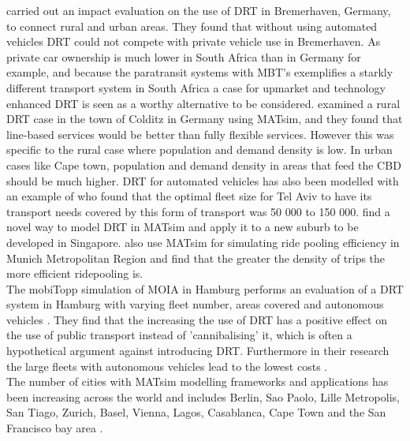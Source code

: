 \documentclass[a4paper]{article}
\begin{document}
\citealp{schluter2021impact} carried out an impact evaluation on the use of DRT in Bremerhaven, Germany, to connect rural and urban areas. They found that without using automated vehicles DRT could not compete with private vehicle use in Bremerhaven. As private car ownership is much lower in South Africa than in Germany for example, and because the paratransit systems with MBT’s  exemplifies a starkly different transport system in South Africa a case for upmarket and technology enhanced DRT is seen as a worthy alternative to be considered.
\citealp{article} examined a rural DRT case in the town of Colditz in Germany using MATsim, and they found that line-based services would be better than fully flexible services. However this was specific to the rural case where population and demand density is low. In urban cases like Cape town, population and demand density in areas that feed the CBD should be much higher.
DRT for automated vehicles has also been modelled with an example of \citealp{Ben-dor} who found that the optimal fleet size for Tel Aviv to have its transport needs covered by this form of transport was 50 000 to 150 000. \citealp{medina2019public} find a novel way to model DRT in MATsim and apply it to a new suburb to be developed in Singapore.
\citealp{engelhardt2019quantifying} also use MATsim for simulating ride pooling efficiency in Munich Metropolitan Region and find that the greater the density of trips the more efficient ridepooling is.\\
The mobiTopp simulation of MOIA in Hamburg performs an evaluation of a DRT system in Hamburg with varying fleet number, areas covered and autonomous vehicles \citep{MOIA}. They find that the increasing the use of DRT has a positive effect on the use of public transport instead of 'cannibalising' it, which is often a hypothetical argument against introducing DRT. Furthermore in their research the large fleets with autonomous vehicles lead to the lowest costs \citep{MOIA}.\\
The number of cities with MATsim modelling frameworks and applications has been increasing across the world and includes Berlin, Sao Paolo, Lille Metropolis, San Tiago, Zurich, Basel, Vienna, Lagos, Casablanca, Cape Town and the San Francisco bay area \citep{kaddoura2020impact, sallard2020agent, kickhofer2016creating, balac2021synthetic, diallo2021agent, ilahi2019existing, kagho2019agent, becker2018matsim, muller2021matsim, benhlima2021towards}.
\\

\end{document}
